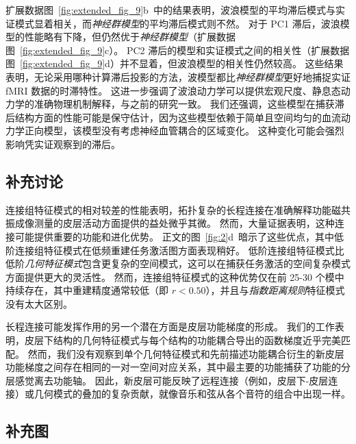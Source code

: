 \documentclass[lang=cn,a4paper,newtx,citestyle=gb7714-2015, bibstyle=gb7714-2015]{elegantpaper}
\begin{document}
扩展数据图~\ref{fig:extended_fig_9}b~中的结果表明，波浪模型的平均滞后模式与实证模式显着相关，而\textit{神经群模型}的平均滞后模式则不然。
对于 PC1 滞后，波浪模型的性能略有下降，但仍然优于\textit{神经群模型}（扩展数据图~\ref{fig:extended_fig_9}c）。
PC2 滞后的模型和实证模式之间的相关性（扩展数据图~\ref{fig:extended_fig_9}d）并不显着，但波浪模型的相关性仍然较高。
这些结果表明，无论采用哪种计算滞后投影的方法，波模型都比\textit{神经群模型}更好地捕捉实证 fMRI 数据的时滞特性。
这进一步强调了波浪动力学可以提供宏观尺度、静息态动力学的准确物理机制解释，与之前的研究一致\cite{robinson2021determination,majeed2011spatiotemporal,matsui2016transient}。
我们还强调，这些模型在捕获滞后结构方面的性能可能是保守估计，因为这些模型依赖于简单且空间均匀的血流动力学正向模型，该模型没有考虑神经血管耦合的区域变化\cite{deco2021dynamical,henderson2022empirical,fischl2012freesurfer}。
这种变化可能会强烈影响凭实证观察到的滞后。



\subsection{补充讨论} \label{sec:supplementary_discussion}

连接组特征模式的相对较差的性能表明，拓扑复杂的长程连接在准确解释功能磁共振成像测量的皮层活动方面提供的益处微乎其微。
然而，大量证据表明，这种连接可能提供重要的功能和进化优势\cite{oldham2020efficacy,arslan2018human,tokariev2019large}。
正文的图~\ref{fig:2}d~暗示了这些优点，其中低阶连接组特征模式在低频重建任务激活图方面表现稍好。
低阶连接组特征模式比低阶\textit{几何特征模式}包含更复杂的空间模式，这可以在捕获任务激活的空间复杂模式方面提供更大的灵活性。
然而，连接组特征模式的这种优势仅在前 25-30 个模中持续存在，其中重建精度通常较低（即 $ r < 0.50 $），并且与\textit{指数距离规则}特征模式没有太大区别。


长程连接可能发挥作用的另一个潜在方面是皮层功能梯度的形成。
我们的工作表明，皮层下结构的几何特征模式与每个结构的功能耦合导出的函数梯度近乎完美匹配。
然而，我们没有观察到单个几何特征模式和先前描述功能耦合衍生的新皮层功能梯度之间存在相同的一对一空间对应关系，其中最主要的功能捕获了功能\cite{chen2022individuality}的分层感觉离去功能轴。
因此，新皮层可能反映了远程连接（例如，皮层下-皮层连接）或几何模式\cite{bolt2022parsimonious}的叠加的复杂贡献，就像音乐和弦从各个音符的组合中出现一样。



\subsection{补充图}
\end{document}
